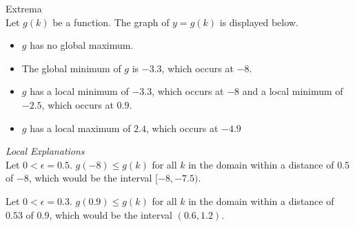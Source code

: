 \documentclass{ximera}
\begin{document}
\begin{example} Extrema \\

Let $g(k)$ be a function.  The graph of $y= g(k)$ is displayed below. 

\begin{image}
\end{image}

\begin{itemize}
\item $g$ has no global maximum.
\item The global minimum of $g$ is $-3.3$, which occurs at $-8$.
\item $g$ has a local minimum of $-3.3$, which occurs at $-8$ and a local minimum of $-2.5$, which occurs at $0.9$.
\item $g$ has a local maximum of $2.4$, which occurs at $-4.9$
\end{itemize}

\end{example}




\textit{Local Explanations} \\

Let $0 < \epsilon = 0.5$.  $g(-8) \leq g(k)$ for all $k$ in the domain within a distance of $0.5$ of $-8$, which would be the interval $[-8, -7.5)$.

Let $0 < \epsilon = 0.3$.  $g(0.9) \leq g(k)$ for all $k$ in the domain within a distance of $0.53$ of $0.9$, which would be the interval $(0.6, 1.2)$.
\end{document}
